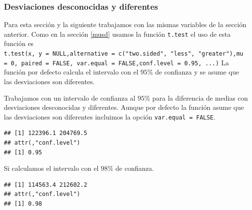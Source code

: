 \documentclass[letterpaper,]{book}
\newenvironment{Shaded}{\begin{snugshade}}{\end{snugshade}}
\newcommand{\DataTypeTok}[1]{\textcolor[rgb]{0.13,0.29,0.53}{#1}}
\newcommand{\FloatTok}[1]{\textcolor[rgb]{0.00,0.00,0.81}{#1}}
\newcommand{\KeywordTok}[1]{\textcolor[rgb]{0.13,0.29,0.53}{\textbf{#1}}}
\newcommand{\NormalTok}[1]{#1}
\newcommand{\OperatorTok}[1]{\textcolor[rgb]{0.81,0.36,0.00}{\textbf{#1}}}
\newcommand{\OtherTok}[1]{\textcolor[rgb]{0.56,0.35,0.01}{#1}}
\begin{document}
\hypertarget{icddd}{%
\subsubsection{Desviaciones desconocidas y diferentes}\label{icddd}}

Para esta sección y la siguiente trabajamos con las mismas variables de la sección anterior. Como en la sección \ref{musd} usamos la función \texttt{t.test} el uso de esta función es \texttt{t.test(x,\ y\ =\ NULL,alternative\ =\ c("two.sided",\ "less",\ "greater"),mu\ =\ 0,\ paired\ =\ FALSE,\ var.equal\ =\ FALSE,conf.level\ =\ 0.95,\ ...)} La función por defecto calcula el intervalo con el \(95\)\% de confianza y se asume que las desviaciones son diferentes.

Trabajamos con un intervalo de confianza al \(95\)\% para la diferencia de medias con desviaciones desconocidas y diferentes. Aunque por defecto la función asume que las desviaciones son diferentes incluimos la opción \texttt{var.equal\ =\ FALSE}.

\begin{Shaded}
\end{Shaded}

\begin{verbatim}
## [1] 122396.1 204769.5
## attr(,"conf.level")
## [1] 0.95
\end{verbatim}

Si calculamos el intervalo con el \(98\)\% de confianza.

\begin{Shaded}
\end{Shaded}

\begin{verbatim}
## [1] 114563.4 212602.2
## attr(,"conf.level")
## [1] 0.98
\end{verbatim}
\end{document}
